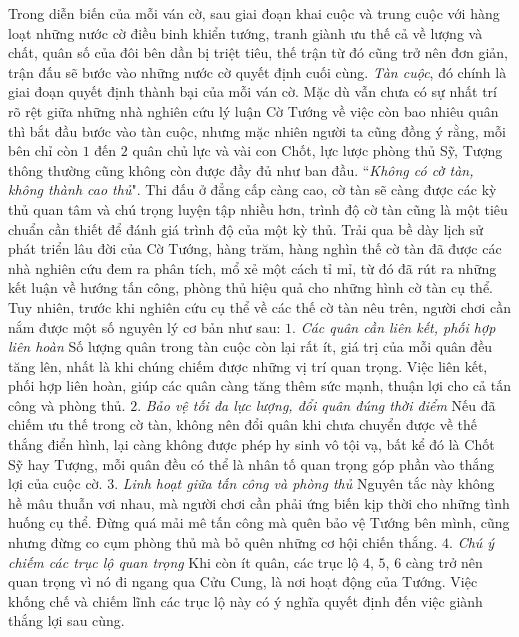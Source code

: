 \vspace*{190pt}
\begin{multicols}{2}
	Trong diễn biến của mỗi ván cờ, sau giai đoạn khai cuộc và trung cuộc với hàng loạt những nước cờ điều binh khiển tướng, tranh giành ưu thế cả về lượng và chất, quân số của đôi bên dần bị triệt tiêu, thế trận từ đó cũng trở nên đơn giản, trận đấu sẽ bước vào những nước cờ quyết định cuối cùng. \textit{Tàn cuộc}, đó chính là giai đoạn quyết định thành bại của mỗi ván cờ. Mặc dù vẫn chưa có sự nhất trí rõ rệt giữa những nhà nghiên cứu lý luận Cờ Tướng về việc còn bao nhiêu quân thì bắt đầu bước vào tàn cuộc, nhưng mặc nhiên người ta cũng đồng ý rằng, mỗi bên chỉ còn $1$ đến $2$ quân chủ lực và vài con Chốt, lực lược phòng thủ Sỹ, Tượng thông thường cũng không còn được đầy đủ như ban đầu.
	\vskip 0.1cm
	``\textit{Không có cờ tàn, không thành cao thủ}". Thi đấu ở đẳng cấp càng cao, cờ tàn sẽ càng được các kỳ thủ quan tâm và chú trọng luyện tập nhiều hơn, trình độ cờ tàn cũng là một tiêu chuẩn cần thiết để đánh giá trình độ của một kỳ thủ. Trải qua bề dày lịch sử phát triển lâu đời của Cờ Tướng, hàng trăm, hàng nghìn thế cờ tàn đã được các nhà nghiên cứu đem ra phân tích, mổ xẻ một cách tỉ mỉ, từ đó đã rút ra những kết luận về hướng tấn công, phòng thủ hiệu quả cho những hình cờ tàn cụ thể. Tuy nhiên, trước khi nghiên cứu cụ thể về các thế cờ tàn nêu trên, người chơi cần nắm được một số nguyên lý cơ bản như sau:
	\vskip 0.1cm
	$1.$ \textit{Các quân cần liên kết, phối hợp liên hoàn}
	\vskip 0.1cm
	Số lượng quân trong tàn cuộc còn lại rất ít, giá trị của mỗi quân đều tăng lên, nhất là khi chúng chiếm được những vị trí quan trọng. Việc liên kết,  phối hợp liên hoàn, giúp các quân càng tăng thêm sức mạnh, thuận lợi cho cả tấn công và phòng thủ. 
	\vskip 0.1cm
	$2.$ \textit{Bảo vệ tối đa lực lượng, đổi quân đúng thời điểm}
	\vskip 0.1cm
	Nếu đã chiếm ưu thế trong cờ tàn, không nên đổi quân khi chưa chuyển được về thế thắng điển hình, lại càng không được phép hy sinh vô tội vạ, bất kể đó là Chốt Sỹ hay Tượng, mỗi quân đều có thể là nhân tố quan trọng góp phần vào thắng lợi của cuộc cờ.
	\vskip 0.1cm
	$3.$ \textit{Linh hoạt giữa tấn công và phòng thủ}
	\vskip 0.1cm
	Nguyên tắc này không hề mâu thuẫn vơi nhau, mà người chơi cần phải ứng biến kịp thời cho những tình huống cụ thể. Đừng quá mải mê tấn công mà quên bảo vệ Tướng bên mình, cũng nhưng đừng co cụm phòng thủ mà bỏ quên những cơ hội chiến thắng.
	\vskip 0.1cm
	$4.$ \textit{Chú ý chiếm các trục lộ quan trọng}
	\vskip 0.1cm
	Khi còn ít quân, các trục lộ $4$, $5$, $6$ càng trở nên quan trọng vì nó đi ngang qua Cửu Cung, là nơi hoạt động của Tướng. Việc khống chế và chiếm lĩnh các trục lộ này có ý nghĩa quyết định đến việc giành thắng lợi sau cùng.

\end{multicols}
